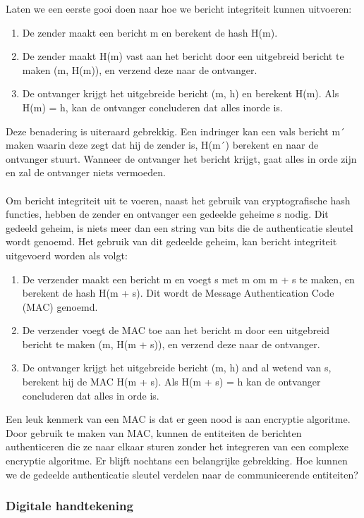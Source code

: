 Laten we een eerste gooi doen naar hoe we bericht integriteit kunnen uitvoeren:
\begin{enumerate}
    \item De zender maakt een bericht m en berekent de hash H(m).
     \item De zender maakt H(m) vast aan het bericht door een uitgebreid bericht te maken (m, H(m)), en verzend deze naar de ontvanger.
 \item De ontvanger krijgt het uitgebreide bericht (m, h) en berekent H(m). Als H(m) = h, kan de ontvanger concluderen dat alles inorde is.
\end{enumerate}
Deze benadering is uiteraard gebrekkig. Een indringer kan een vals bericht m´ maken waarin deze zegt dat hij de zender is, H(m´) berekent en naar de ontvanger stuurt. Wanneer de ontvanger het bericht krijgt, gaat alles in orde zijn en zal de ontvanger niets vermoeden.
\\\\
Om bericht integriteit uit te voeren, naast het gebruik van cryptografische hash functies, hebben de zender en ontvanger een gedeelde geheime s nodig. Dit gedeeld geheim, is niets meer dan een string van bits die de authenticatie sleutel wordt genoemd. Het gebruik van dit gedeelde geheim, kan bericht integriteit uitgevoerd worden als volgt:
\begin{enumerate}
    \item De verzender maakt een bericht m en voegt s met m om m + s te maken, en berekent de hash H(m + s). Dit wordt de Message Authentication Code (MAC) genoemd.
    \item De verzender voegt de MAC toe aan het bericht m door een uitgebreid bericht te maken (m, H(m + s)), en verzend deze naar de ontvanger.
    \item De ontvanger krijgt het uitgebreide bericht (m, h) and al wetend van s, berekent hij de MAC H(m + s). Als H(m + s) = h kan de ontvanger concluderen dat alles in orde is.
\end{enumerate}
Een leuk kenmerk van een MAC is dat er geen nood is aan encryptie algoritme. Door gebruik te maken van MAC, kunnen de entiteiten de berichten authenticeren die ze naar elkaar sturen zonder het integreren van een complexe encryptie algoritme.
Er blijft nochtans een belangrijke gebrekking. Hoe kunnen we de gedeelde authenticatie sleutel verdelen naar de communicerende entiteiten?

\clearpage

\subsubsection{Digitale handtekening}

